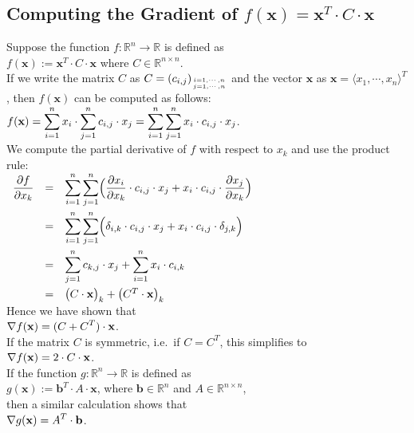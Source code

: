 \subsection{Computing the Gradient of $f(\mathbf{x}) = \mathbf{x}^T \cdot C \cdot \mathbf{x}$}
Suppose the function $f:\mathbb{R}^n \rightarrow \mathbb{R}$ is defined as
\\[0.2cm]
\hspace*{1.3cm}
$f(\mathbf{x}) := \mathbf{x}^T \cdot C \cdot \mathbf{x}$ \quad where $C \in \mathbb{R}^{n \times n}$.
\\[0.2cm]
If we write the matrix $C$ as $C = (c_{i,j})_{i=1,\cdots,n \atop j=1,\cdots,n}$ and the vector
$\mathbf{x}$ as $\mathbf{x} = \langle x_1, \cdots, x_n \rangle^T$,  then $f(\mathbf{x})$ can be
computed as follows:
\\[0.2cm]
\hspace*{1.3cm}
$\displaystyle f(\mathbf{x}) = \sum\limits_{i=1}^n x_i \cdot \sum\limits_{j=1}^n c_{i,j} \cdot x_j 
                   = \sum\limits_{i=1}^n \sum\limits_{j=1}^n x_i \cdot c_{i,j} \cdot x_j
$.
\\[0.2cm]
We compute the partial derivative of $f$ with respect to $x_k$ and use the product rule:
\\[0.2cm]
\hspace*{1.3cm}
$
\begin{array}[t]{lcl}
\displaystyle \frac{\partial f}{\partial x_k} & = &
\displaystyle \sum\limits_{i=1}^n \sum\limits_{j=1}^n \Bigl(
    \frac{\partial x_i}{\partial x_k} \cdot c_{i,j} \cdot x_j + x_i \cdot c_{i,j} \cdot \frac{\partial x_j}{\partial x_k}
    \Bigr) \\[0.5cm]
& = &
\displaystyle \sum\limits_{i=1}^n \sum\limits_{j=1}^n \Bigl(
    \delta_{i,k} \cdot c_{i,j} \cdot x_j + x_i \cdot c_{i,j} \cdot \delta_{j,k} \Bigr) \\[0.5cm]
& = &
\displaystyle \sum\limits_{j=1}^n c_{k,j} \cdot x_j + \sum\limits_{i=1}^n x_i \cdot c_{i,k} \\[0.5cm]
& = &
  \bigl(C \cdot \mathbf{x}\bigr)_k + \bigl(C^T \cdot \mathbf{x}\bigr)_k
\end{array}
$
\\[0.2cm]
Hence we have shown that 
\\[0.2cm]
\hspace*{1.3cm}
$\displaystyle \nabla f(\mathbf{x}) = (C + C^T) \cdot \mathbf{x}$.
\\[0.2cm]
If the matrix $C$ is symmetric, i.e.~if $C = C^T$, this simplifies to
\\[0.2cm]
\hspace*{1.3cm}
$\displaystyle \nabla f(\mathbf{x}) = 2 \cdot C \cdot \mathbf{x}$.
\\[0.2cm]
If the function $g: \mathbb{R}^n \rightarrow \mathbb{R}$ is defined as 
\\[0.2cm]
\hspace*{1.3cm}
$g(\mathbf{x}) := \mathbf{b}^T \cdot A \cdot \mathbf{x}$, \quad where $\mathbf{b} \in \mathbb{R}^n$ and $A \in \mathbb{R}^{n \times n}$,
\\[0.2cm]
then a similar calculation shows that
\\[0.2cm]
\hspace*{1.3cm}
$\displaystyle \nabla g(\mathbf{x}) = A^T \cdot \mathbf{b}$.

